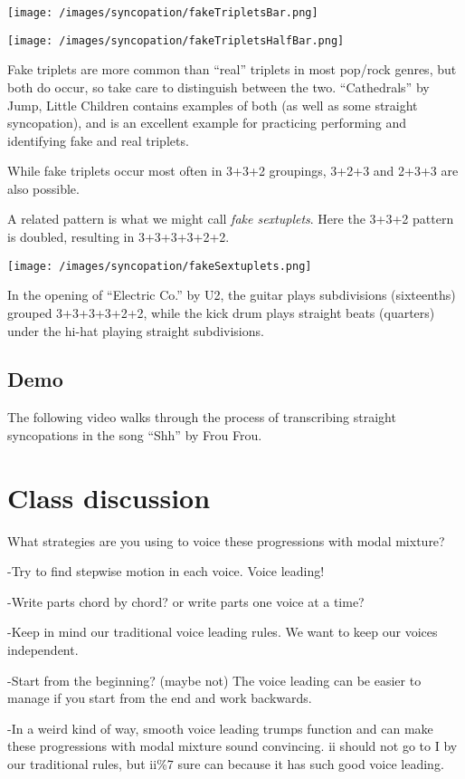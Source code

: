 \documentclass{book}
\begin{document}
\texttt{[image: /images/syncopation/fakeTripletsBar.png]}

\texttt{[image: /images/syncopation/fakeTripletsHalfBar.png]}

Fake triplets are more common than ``real'' triplets in most pop/rock genres,
but both do occur, so take care to distinguish between the two. ``Cathedrals''
by Jump, Little Children contains examples of both (as well as some straight
syncopation), and is an excellent example for practicing performing and
identifying fake and real triplets.

While fake triplets occur most often in 3+3+2 groupings, 3+2+3 and 2+3+3 are
also possible.

A related pattern is what we might call \emph{fake sextuplets}. Here the 3+3+2
pattern is doubled, resulting in 3+3+3+3+2+2.

\texttt{[image: /images/syncopation/fakeSextuplets.png]}

In the opening of ``Electric Co.'' by U2, the guitar plays subdivisions
(sixteenths) grouped 3+3+3+3+2+2, while the kick drum plays straight beats
(quarters) under the hi-hat playing straight subdivisions.

\hypertarget{demo}{%
\section{Demo}\label{demo}}

The following video walks through the process of transcribing straight
syncopations in the song ``Shh'' by Frou Frou.

\hypertarget{class-discussion-52}{%
\chapter{Class discussion}\label{class-discussion-52}}

What strategies are you using to voice these progressions with modal mixture?

-Try to find stepwise motion in each voice. Voice leading!

-Write parts chord by chord? or write parts one voice at a time?

-Keep in mind our traditional voice leading rules. We want to keep our voices
independent.

-Start from the beginning? (maybe not) The voice leading can be easier to
manage if you start from the end and work backwards.

-In a weird kind of way, smooth voice leading trumps function and can make
these progressions with modal mixture sound convincing. ii should not go to I
by our traditional rules, but ii\%7 sure can because it has such good voice
leading.
\end{document}
